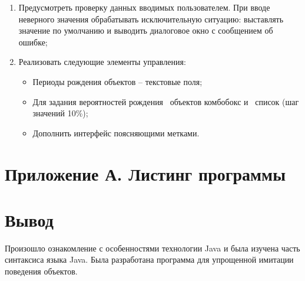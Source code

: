 \documentclass{article}
\begin{document}
\begin{enumerate}
\item Предусмотреть проверку данных вводимых пользователем. При вводе неверного значения обрабатывать исключительную ситуацию: выставлять значение по умолчанию и выводить диалоговое окно с сообщением об ошибке;
\item Реализовать следующие элементы управления:
\begin{itemize}
	\item Периоды рождения объектов – текстовые поля;
	\item Для задания вероятностей рождения  объектов комбобокс и  список (шаг значений 	10\%);
	\item Дополнить интерфейс поясняющими метками.
\end{itemize}
\end{enumerate}

\section*{Приложение А. Листинг программы}


\section*{Вывод}
Произошло ознакомление с особенностями технологии Java и была изучена часть синтаксиса языка Java. Была разработана программа для упрощенной имитации поведения объектов.
\end{document}
